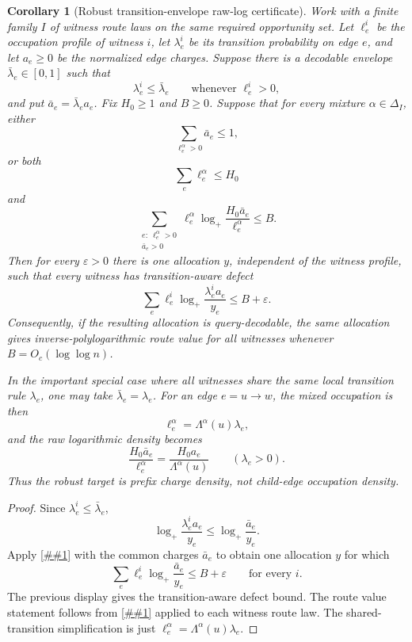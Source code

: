 \documentclass[10pt]{article}
\newcommand{\cref}[1]{\ref{##1}}
\newtheorem{corollary}[theorem]{Corollary}
\theoremstyle{definition}
\begin{document}
\begin{corollary}[Robust transition-envelope raw-log certificate]
   \label{cor:robust-transition-envelope-raw-log}
   Work with a finite family \(I\) of witness route laws on the same required
   opportunity set.  Let \(\ell^i_e\) be the occupation profile of witness
   \(i\), let \(\lambda^i_e\) be its transition probability on edge \(e\), and
   let \(a_e\ge0\) be the normalized edge charges.  Suppose there is a
   decodable envelope \(\bar\lambda_e\in[0,1]\) such that
   \[
      \lambda^i_e\le\bar\lambda_e
      \qquad\text{whenever }\ell^i_e>0,
   \]
   and put \(\bar a_e=\bar\lambda_ea_e\).  Fix \(H_0\ge1\) and \(B\ge0\).
   Suppose that for every mixture \(\alpha\in\Delta_I\), either
   \[
      \sum_{\ell^\alpha_e>0}\bar a_e\le1,
   \]
   or both
   \[
      \sum_e\ell^\alpha_e\le H_0
   \]
   and
   \[
      \sum_{\substack{e:\ \ell^\alpha_e>0\\ \bar a_e>0}}
      \ell^\alpha_e
      \log_+\frac{H_0\bar a_e}{\ell^\alpha_e}
      \le B .
   \]
   Then for every \(\varepsilon>0\) there is one allocation \(y\), independent
   of the witness profile, such that every witness has transition-aware defect
   \[
      \sum_e
      \ell^i_e
      \log_+\frac{\lambda^i_ea_e}{y_e}
      \le B+\varepsilon .
   \]
   Consequently, if the resulting allocation is query-decodable, the same
   allocation gives inverse-polylogarithmic route value for all witnesses
   whenever \(B=O_c(\log\log n)\).

   In the important special case where all witnesses share the same local
   transition rule \(\lambda_e\), one may take
   \(\bar\lambda_e=\lambda_e\).  For an edge \(e=u\to w\), the mixed
   occupation is then
   \[
      \ell^\alpha_e=\Lambda^\alpha(u)\lambda_e,
   \]
   and the raw logarithmic density becomes
   \[
      \frac{H_0\bar a_e}{\ell^\alpha_e}
      =
      \frac{H_0a_e}{\Lambda^\alpha(u)}
      \qquad(\lambda_e>0).
   \]
   Thus the robust target is prefix charge density, not child-edge occupation
   density.
\end{corollary}

\begin{proof}
   Since \(\lambda^i_e\le\bar\lambda_e\),
   \[
      \log_+\frac{\lambda^i_ea_e}{y_e}
      \le
      \log_+\frac{\bar a_e}{y_e}.
   \]
   Apply \cref{cor:robust-waterfilled-raw-log} with the common charges
   \(\bar a_e\) to obtain one allocation \(y\) for which
   \[
      \sum_e\ell^i_e\log_+\frac{\bar a_e}{y_e}
      \le B+\varepsilon
      \qquad\text{for every }i.
   \]
   The previous display gives the transition-aware defect bound.  The route
   value statement follows from \cref{cor:transition-waterfilled-allocation}
   applied to each witness route law.  The shared-transition simplification is
   just \(\ell^\alpha_e=\Lambda^\alpha(u)\lambda_e\).
\end{proof}
\end{document}
